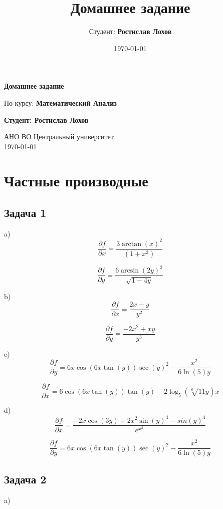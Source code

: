 \documentclass[a4paper,12pt]{article}
\title{Домашнее задание}
\author{Студент: \textbf{Ростислав Лохов}}
\date{\today}
\begin{document}
\begin{titlepage}
    \centering
    \vspace*{1cm}

    \Huge
    \textbf{Домашнее задание}

    \vspace{0.5cm}
    \LARGE
    По курсу: \textbf{Математический Анализ}

    \vspace{1.5cm}

    \textbf{Студент: Ростислав Лохов}

    \vfill

    \Large
    АНО ВО Центральный университет\\
    \vspace{0.3cm}
    \today

\end{titlepage}

\tableofcontents
\newpage

\section{Частные производные}

\subsection{Задача 1}

a)
\[
\frac{\partial f}{\partial x} = \frac{3\arctan(x)^2}{(1+x^2)}
\]

\[
\frac{\partial f}{\partial y} = \frac{6\arcsin(2y)^2}{\sqrt{1-4y}}
\]

b)
\[
\frac{\partial f}{\partial x} = \frac{2x-y}{y^2}
\]

\[
\frac{\partial f}{\partial y} = \frac{-2x^2+xy}{y^3}
\]

c) 
\[
\frac{\partial f}{\partial y} = 6x \cos(6x \tan(y)) \sec(y)^2 - \frac{x^2}{6\ln(5)y}
\]

\[
\frac{\partial f}{\partial x} = 6\cos(6x\tan(y))\tan(y) - 2\log_{5}(\sqrt[6]{11y})x
\]

d)
\[
\frac{\partial f}{\partial x} = \frac{-2x\cos(3y)+2x^2\sin(y)^4-sin(y)^4}{e^{x^2}}
\]

\[
\frac{\partial f}{\partial y} = 6x\cos(6x\tan(y))\sec(y)^2-\frac{x^2}{6\ln(5)y}
\]

\subsection{Задача 2}

a)
\end{document}

